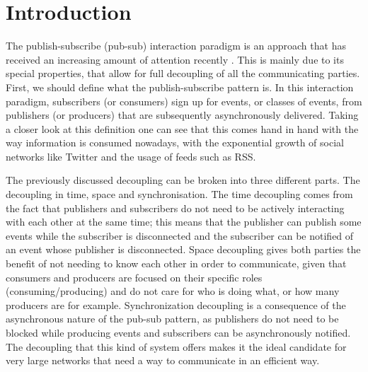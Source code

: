 
%
%

\section{Introduction}

The publish-subscribe (pub-sub) interaction paradigm is an approach that has
received an increasing amount of attention recently \cite{Kermarrec2013}
\cite{Eugster2003}.  This is mainly due to its special properties, that allow
for full decoupling of all the communicating parties. First, we should define
what the publish-subscribe pattern is.  In this interaction paradigm,
subscribers (or consumers) sign up for events, or classes of events, from
publishers (or producers) that are subsequently asynchronously delivered.
Taking a closer look at this definition one can see that this comes hand in
hand with the way information is consumed nowadays, with the exponential growth
of social networks like Twitter and the usage of feeds such as RSS.

The previously discussed decoupling can be broken into three different parts.
The decoupling in time, space and synchronisation. The time decoupling comes
from the fact that publishers and subscribers do not need to be actively
interacting with each other at the same time; this means that the publisher can
publish some events while the subscriber is disconnected and the subscriber can
be notified of an event whose publisher is disconnected. Space decoupling gives
both parties the benefit of not needing to know each other in order to
communicate, given that consumers and producers are focused on their specific
roles (consuming/producing) and do not care for who is doing what, or how many
producers are for example. Synchronization decoupling is a consequence of the
asynchronous nature of the pub-sub pattern, as publishers do not need to be
blocked while producing events and subscribers can be asynchronously notified.
The decoupling that this kind of system offers makes it the ideal candidate for
very large networks that need a way to communicate in an efficient way.

